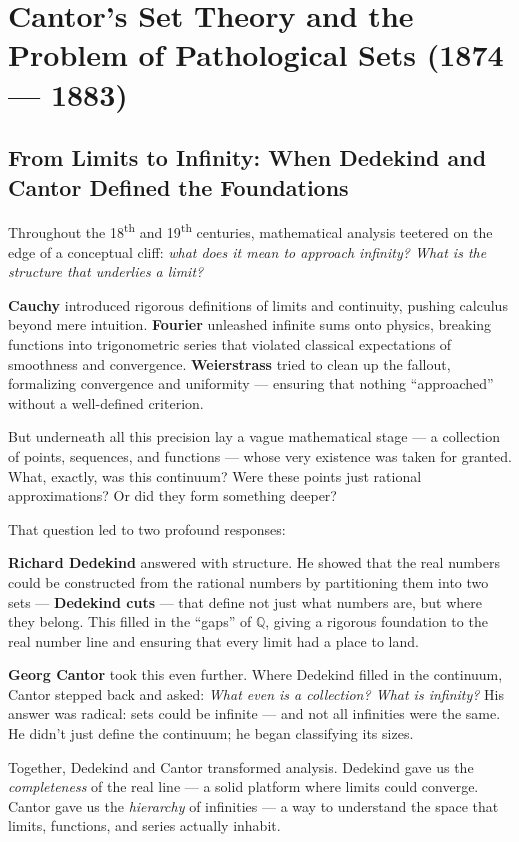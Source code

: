 \section{Cantor’s Set Theory and the Problem of Pathological Sets (1874 --- 1883)}

\subsection{From Limits to Infinity: When Dedekind and Cantor Defined the Foundations}

Throughout the 18\textsuperscript{th} and 19\textsuperscript{th} centuries, mathematical analysis teetered on the edge of a conceptual cliff: \textit{what does it mean to approach infinity? What is the structure that underlies a limit?}

\textbf{Cauchy} introduced rigorous definitions of limits and continuity, pushing calculus beyond mere intuition.  
\textbf{Fourier} unleashed infinite sums onto physics, breaking functions into trigonometric series that violated classical expectations of smoothness and convergence.  
\textbf{Weierstrass} tried to clean up the fallout, formalizing convergence and uniformity — ensuring that nothing “approached” without a well-defined criterion.

But underneath all this precision lay a vague mathematical stage — a collection of points, sequences, and functions — whose very existence was taken for granted. What, exactly, was this continuum? Were these points just rational approximations? Or did they form something deeper?

That question led to two profound responses:

\textbf{Richard Dedekind} answered with structure. He showed that the real numbers could be constructed from the rational numbers by partitioning them into two sets — \textbf{Dedekind cuts} — that define not just what numbers are, but where they belong. This filled in the “gaps” of \( \mathbb{Q} \), giving a rigorous foundation to the real number line and ensuring that every limit had a place to land.

\textbf{Georg Cantor} took this even further. Where Dedekind filled in the continuum, Cantor stepped back and asked: \textit{What even is a collection? What is infinity?} His answer was radical: sets could be infinite — and not all infinities were the same. He didn’t just define the continuum; he began classifying its sizes.

Together, Dedekind and Cantor transformed analysis. Dedekind gave us the \textit{completeness} of the real line — a solid platform where limits could converge. Cantor gave us the \textit{hierarchy} of infinities — a way to understand the space that limits, functions, and series actually inhabit.

